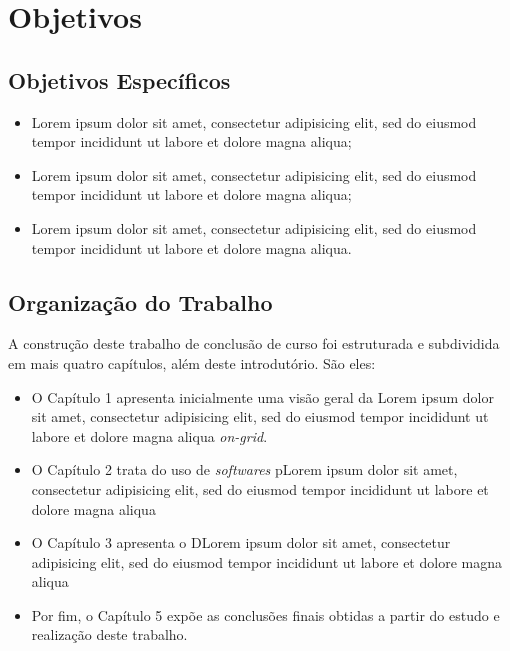 \chapter{Objetivos}

\lipsum[1]

\section{Objetivos Específicos}

\begin{itemize}
    \item Lorem ipsum dolor sit amet, consectetur adipisicing elit, sed do eiusmod tempor incididunt ut labore et dolore magna aliqua;
    \item Lorem ipsum dolor sit amet, consectetur adipisicing elit, sed do eiusmod tempor incididunt ut labore et dolore magna aliqua;
    \item Lorem ipsum dolor sit amet, consectetur adipisicing elit, sed do eiusmod tempor incididunt ut labore et dolore magna aliqua.
\end{itemize}

\section{Organização do Trabalho}

A construção deste trabalho de conclusão de curso foi estruturada e subdividida em mais quatro capítulos, além deste introdutório. São eles:

\begin{itemize}
    \item O Capítulo 1 apresenta inicialmente uma visão geral da Lorem ipsum dolor sit amet, consectetur adipisicing elit, sed do eiusmod tempor incididunt ut labore et dolore magna aliqua \textit{on-grid}.
    
    \item O Capítulo 2 trata do uso de \textit{softwares } pLorem ipsum dolor sit amet, consectetur adipisicing elit, sed do eiusmod tempor incididunt ut labore et dolore magna aliqua
    
    \item O Capítulo 3 apresenta o DLorem ipsum dolor sit amet, consectetur adipisicing elit, sed do eiusmod tempor incididunt ut labore et dolore magna aliqua
    
    \item Por fim, o Capítulo 5 expõe as conclusões finais obtidas a partir do estudo e realização deste trabalho.
\end{itemize}